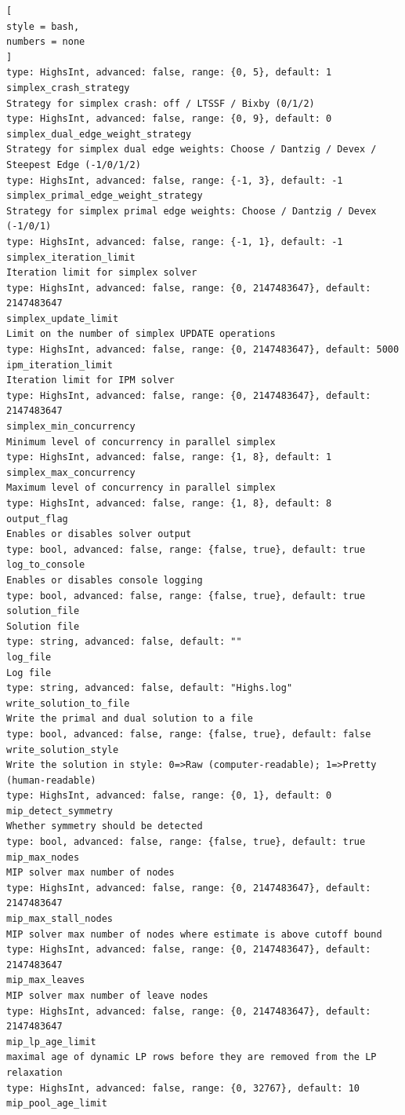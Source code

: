 \documentclass[%
	11pt,
	a4paper,
	utf8,
		]{article}
\begin{document}
\begin{lstlisting}[
style = bash,
numbers = none
]
type: HighsInt, advanced: false, range: {0, 5}, default: 1
simplex_crash_strategy
Strategy for simplex crash: off / LTSSF / Bixby (0/1/2)
type: HighsInt, advanced: false, range: {0, 9}, default: 0
simplex_dual_edge_weight_strategy
Strategy for simplex dual edge weights: Choose / Dantzig / Devex / Steepest Edge (-1/0/1/2)
type: HighsInt, advanced: false, range: {-1, 3}, default: -1
simplex_primal_edge_weight_strategy
Strategy for simplex primal edge weights: Choose / Dantzig / Devex (-1/0/1)
type: HighsInt, advanced: false, range: {-1, 1}, default: -1
simplex_iteration_limit
Iteration limit for simplex solver
type: HighsInt, advanced: false, range: {0, 2147483647}, default: 2147483647
simplex_update_limit
Limit on the number of simplex UPDATE operations
type: HighsInt, advanced: false, range: {0, 2147483647}, default: 5000
ipm_iteration_limit
Iteration limit for IPM solver
type: HighsInt, advanced: false, range: {0, 2147483647}, default: 2147483647
simplex_min_concurrency
Minimum level of concurrency in parallel simplex
type: HighsInt, advanced: false, range: {1, 8}, default: 1
simplex_max_concurrency
Maximum level of concurrency in parallel simplex
type: HighsInt, advanced: false, range: {1, 8}, default: 8
output_flag
Enables or disables solver output
type: bool, advanced: false, range: {false, true}, default: true
log_to_console
Enables or disables console logging
type: bool, advanced: false, range: {false, true}, default: true
solution_file
Solution file
type: string, advanced: false, default: ""
log_file
Log file
type: string, advanced: false, default: "Highs.log"
write_solution_to_file
Write the primal and dual solution to a file
type: bool, advanced: false, range: {false, true}, default: false
write_solution_style
Write the solution in style: 0=>Raw (computer-readable); 1=>Pretty (human-readable)
type: HighsInt, advanced: false, range: {0, 1}, default: 0
mip_detect_symmetry
Whether symmetry should be detected
type: bool, advanced: false, range: {false, true}, default: true
mip_max_nodes
MIP solver max number of nodes
type: HighsInt, advanced: false, range: {0, 2147483647}, default: 2147483647
mip_max_stall_nodes
MIP solver max number of nodes where estimate is above cutoff bound
type: HighsInt, advanced: false, range: {0, 2147483647}, default: 2147483647
mip_max_leaves
MIP solver max number of leave nodes
type: HighsInt, advanced: false, range: {0, 2147483647}, default: 2147483647
mip_lp_age_limit
maximal age of dynamic LP rows before they are removed from the LP relaxation
type: HighsInt, advanced: false, range: {0, 32767}, default: 10
mip_pool_age_limit

\end{lstlisting}
\end{document}
